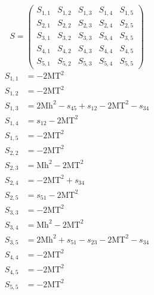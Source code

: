 \documentclass[a4paper]{article}
\begin{document}
\begin{equation}
S=\left(\begin{array}{ccccc}
   S_{1,1}&
   S_{1,2}&
   S_{1,3}&
   S_{1,4}&
   S_{1,5}\\
   S_{2,1}&
   S_{2,2}&
   S_{2,3}&
   S_{2,4}&
   S_{2,5}\\
   S_{3,1}&
   S_{3,2}&
   S_{3,3}&
   S_{3,4}&
   S_{3,5}\\
   S_{4,1}&
   S_{4,2}&
   S_{4,3}&
   S_{4,4}&
   S_{4,5}\\
   S_{5,1}&
   S_{5,2}&
   S_{5,3}&
   S_{5,4}&
   S_{5,5}\end{array}\right)
\end{equation}
\begin{subequations}
\begin{align}
   S_{1,1}&=-2\text{MT}^2\\
   S_{1,2}&=-2\text{MT}^2\\
   S_{1,3}&=2\text{Mh}^2-s_{45}+s_{12}-2\text{MT}^2-s_{34}\\
   S_{1,4}&=s_{12}-2\text{MT}^2\\
   S_{1,5}&=-2\text{MT}^2\\
   S_{2,2}&=-2\text{MT}^2\\
   S_{2,3}&=\text{Mh}^2-2\text{MT}^2\\
   S_{2,4}&=-2\text{MT}^2+s_{34}\\
   S_{2,5}&=s_{51}-2\text{MT}^2\\
   S_{3,3}&=-2\text{MT}^2\\
   S_{3,4}&=\text{Mh}^2-2\text{MT}^2\\
   S_{3,5}&=2\text{Mh}^2+s_{51}-s_{23}-2\text{MT}^2-s_{34}\\
   S_{4,4}&=-2\text{MT}^2\\
   S_{4,5}&=-2\text{MT}^2\\
   S_{5,5}&=-2\text{MT}^2
\end{align}
\end{subequations}
\end{document}
